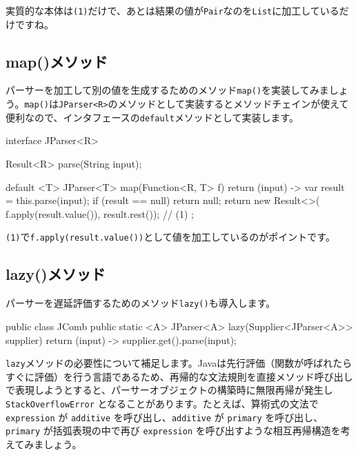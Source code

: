 実質的な本体は\texttt{(1)}だけで、あとは結果の値が\texttt{Pair}なのを\texttt{List}に加工しているだけですね。

\subsection{map()メソッド}

パーサーを加工して別の値を生成するためのメソッド\texttt{map()}を実装してみましょう。\texttt{map()}は\texttt{JParser\textless{}R\textgreater{}}のメソッドとして実装するとメソッドチェインが使えて便利なので、インタフェースの\texttt{default}メソッドとして実装します。

\begin{codescreen}{}
interface JParser<R> {
    Result<R> parse(String input);

    default <T> JParser<T> map(Function<R, T> f) {
        return (input) -> {
            var result = this.parse(input);
            if (result == null) return null;
            return new Result<>(
                f.apply(result.value()), result.rest()); // (1)
        };
    }
}
\end{codescreen}

\texttt{(1)}で\texttt{f.apply(result.value())}として値を加工しているのがポイントです。

\subsection{lazy()メソッド}

パーサーを遅延評価するためのメソッド\texttt{lazy()}も導入します。

\begin{codescreen}{}
public class JComb {
    public static <A> JParser<A> lazy(Supplier<JParser<A>> supplier) {
        return (input) -> supplier.get().parse(input);
    }
}
\end{codescreen}

\texttt{lazy}メソッドの必要性について補足します。Javaは先行評価（関数が呼ばれたらすぐに評価）を行う言語であるため、再帰的な文法規則を直接メソッド呼び出しで表現しようとすると、パーサーオブジェクトの構築時に無限再帰が発生し
\texttt{StackOverflowError} となることがあります。たとえば、算術式の文法で
\texttt{expression} が \texttt{additive} を呼び出し、\texttt{additive}
が \texttt{primary} を呼び出し、\texttt{primary} が括弧表現の中で再び
\texttt{expression} を呼び出すような相互再帰構造を考えてみましょう。

